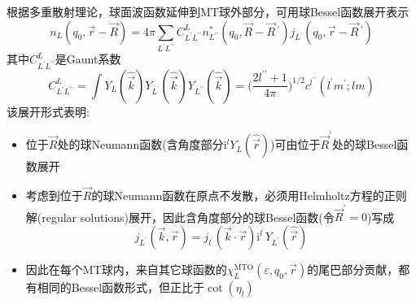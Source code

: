 {		根据多重散射理论，球面波函数延伸到\textrm{MT}球外部分，可用球\textrm{Bessel}函数展开表示
		\begin{displaymath}
			n_L(q_0,\vec r-\vec R)=4\pi\sum_{L^{\prime}L^{\prime\prime}}C_{L^{\prime}L^{\prime\prime}}^Ln_{L^{\prime\prime}}^{\ast}(q_0,\vec R-\vec R\,^{\prime})j_{L^{\prime}}(q_0,\vec r-\vec R\,^{\prime})
		\end{displaymath}
		其中$C_{L^{\prime}L^{\prime\prime}}^L$是\textrm{Gaunt}系数
		\begin{displaymath}
			C_{L^{\prime}L^{\prime\prime}}^L=\int Y_L(\hat{\vec k})Y_{L^{\prime}}(\hat{\vec k})Y_{L^{\prime\prime}}(\hat{\vec k})=\bigg(\dfrac{2l^{\prime\prime}+1}{4\pi}\bigg)^{1/2}c^{l^{\prime\prime}}(l^{\prime}m^{\prime};lm)
		\end{displaymath}
		该展开形式表明:
		\begin{itemize}
			\item 位于$\vec R$处的球\textrm{Neumann}函数(含角度部分$\mathrm{i}^lY_L(\hat{\vec r})$)可由位于$\vec R^{\prime}$处的球\textrm{Bessel}函数展开
			\item 考虑到位于$\vec R$的球\textrm{Neumann}函数在原点不发散，必须用\textrm{Helmholtz}方程的正则解\textrm{(regular solutions)}展开，因此含角度部分的球\textrm{Bessel}函数(令$\vec R^{\prime}=0$)写成
				\begin{displaymath}
					j_{L^{\prime}}(\vec k,\vec r)=j_{l^{\prime}}(\vec k\cdot\vec r)\mathrm{i}^{l^{\prime}}Y_{L^{\prime}}(\hat{\vec r})
				\end{displaymath}
			\item 因此在每个\textrm{MT}球内，来自其它球函数的$\chi_L^{\mathrm{MTO}}(\varepsilon,q_0,\vec r)$的尾巴部分贡献，都有相同的\textrm{Bessel}函数形式，但正比于$\cot(\eta_l)$
		\end{itemize}

}

